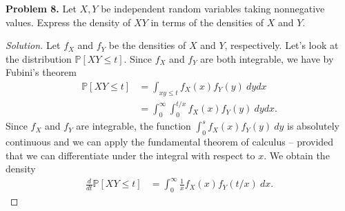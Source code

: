 \documentclass[11pt,letterpaper]{report}
\newcommand{\Prob}{\mathbb{P}}
\newenvironment{solution}
{\begin{proof}[Solution]}
{\end{proof}}
\begin{document}
\noindent\textbf{Problem 8. }
Let $X,Y$ be independent random variables taking nonnegative values. Express the density of $XY$ in terms of the densities of $X$ and $Y$.
\begin{solution}
	Let $f_X$ and $f_Y$ be the densities of $X$ and $Y$, respectively. Let's look at the distribution $\Prob[XY\leq t]$. Since $f_X$ and $f_Y$ are both integrable, we have by Fubini's theorem
	\begin{align*}
		\Prob[XY\leq t] &= \int_{xy\leq t}f_X(x)f_Y(y)\ dydx\\
		&= \int_0^\infty\int_0^{t/x}f_X(x)f_Y(y)\ dydx.
	\end{align*}
	Since $f_X$ and $f_Y$ are integrable, the function $\int_0^sf_X(x)f_Y(y)\ dy$ is absolutely continuous and we can apply the fundamental theorem of calculus -- provided that we can differentiate under the integral with respect to $x$. We obtain the density
	\begin{align*}
		\frac{d}{dt}\Prob[XY\leq t] &= \int_0^\infty \frac{1}{x}f_X(x)f_Y(t/x)\ dx.
	\end{align*}
\end{solution}
\end{document}
